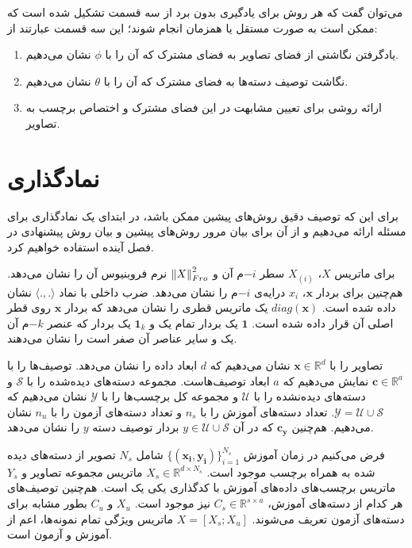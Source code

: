  می‌توان گفت که هر روش برای یادگیری بدون برد از سه قسمت تشکیل شده است که ممکن است به صورت مستقل یا همزمان انجام شوند؛ این سه قسمت عبارتند از:
\begin{enumerate}
  \item یادگرفتن نگاشتی از فضای تصاویر به فضای مشترک
  که آن را با $\phi$ نشان می‌دهیم.
  \item نگاشت توصیف دسته‌ها به فضای مشترک
  که آن را با $\theta$ نشان می‌دهیم.
  \item
   ارائه روشی برای تعیین مشابهت در این فضای مشترک و اختصاص برچسب به تصاویر.
\end{enumerate}

\section{نماد‌گذاری}\label{notaion}
برای این که توصیف دقیق روش‌های پیشین ممکن باشد، در ابتدای یک نمادگذاری برای مسئله ارائه می‌دهیم و از آن برای بیان مرور روش‌های پیشین و بیان روش پیشنهادی در فصل آینده استفاده خواهیم کرد.

برای ماتریس $X$،    
$X_{(i)}$
 سطر $-i$م آن و 
$\left \lVert X \right \rVert_{Fro}^2$
نرم فروبنیوس آن را نشان می‌دهد. هم‌چنین برای بردار $\mathbf{x}$،
 $x_i$ 
 درایه‌ی $-i$م را نشان می‌دهد.
    ضرب داخلی با نماد  
$\langle ., . \rangle $
     نشان داده شده است.
$diag(\mathbf{x})$
یک ماتریس قطری  را نشان می‌دهد که بردار $\mathbf{x} $ روی قطر اصلی آن قرار داده شده است.  $\mathbf{1}$ یک بردار تمام یک و $\mathbf{1}_k$ یک بردار که عنصر $-k$م آن یک و سایر عناصر آن صفر است را نشان می‌دهند. 

 تصاویر را با
 $\mathbf{x}  \in \mathbb{R}^d$
 نشان می‌دهیم که $d$ ابعاد داده را نشان می‌دهد. توصیف‌ها را با
 $ \mathbf{c}  \in \mathbb{R}^a$
 نمایش می‌دهیم که  $a$ ابعاد توصیف‌هاست. مجموعه دسته‌های دیده‌شده را با  $ \mathcal{S}$ و دسته‌های دیده‌نشده را با $ \mathcal{U}$ و مجموعه کل برچسب‌ها را با $ \mathcal{Y}$
 نشان می‌دهیم که
 $ \mathcal{Y} =  \mathcal{U} \cup \mathcal{S} $.
 تعداد دسته‌های آموزش را با $n_s$ و تعداد دسته‌های آزمون را با $n_u$ نشان می‌دهیم.
هم‌چنین   $\mathbf{c_y} $ که در آن    $ y \in \mathcal{U} \cup \mathcal{S} $ بردار توصیف دسته $y$ را نشان می‌دهد.

    فرض می‌کنیم در زمان آموزش 
    $ \{ (\mathbf{x_i, y_i}) \}_{i=1}^{N_s} $
     شامل $N_s$
     تصویر از دسته‌های دیده شده به همراه برچسب  موجود است.
     $X_s \in \mathbb{R}^{d \times N_s }$
  ماتریس مجموعه تصاویر و $Y_s$ ماتریس برچسب‌های داده‌های آموزش با کدگذاری یکی یک
   است.  هم‌چنین توصیف‌های هر کدام از دسته‌های آموزش،
  $C_s \in \mathbb{R}^{s \times a}$
 نیز موجود است. $X_u$ و $C_u$ بطور مشابه برای دسته‌های آزمون تعریف می‌شوند.
$ X = [X_s;X_u]$
ماتریس ویژگی تمام نمونه‌ها، اعم از آموزش و آزمون است.


